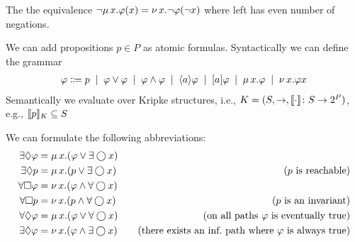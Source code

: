 \begin{remark}
 The the equivalence $\neg \mu\, x. \varphi(x) = \nu\, x . \neg \varphi (\neg x)$ where left has even number of negations.
\end{remark}



\begin{definition}
We can add propositions $p\in P$ as atomic formulas. Syntactically we can define the grammar
 \begin{align*}
        \varphi \Coloneqq p \; \mid \; \varphi \lor \varphi\; \mid \;  \varphi \land \varphi \; \mid \;  \langle a \rangle\varphi  \; \mid \; [ a ]\varphi  \; \mid \;  \mu\, x. \varphi \; \mid \; \nu\, x. \varphi x
\end{align*}
    Semantically we evaluate over Kripke structures, i.e., $K=(S, \to, \llbracket \cdot \rrbracket\colon S\to 2^P)$, e.g., $\llbracket p \rrbracket_K\subseteq S$
\end{definition}

\begin{remark}
    We can formulate the following abbreviations:
    \begin{align*}
        \exists \lozenge \varphi &= \mu\, x. (\varphi \lor \exists \bigcirc x) \\
        \exists \lozenge p &= \mu\, x. (p \lor \exists \bigcirc x) & \quad \text{($p$ is reachable)} \\
         \forall \square \varphi &= \nu\, x. (\varphi \land \forall \bigcirc x) \\
         \forall \square p &= \nu\, x. (p \land \forall \bigcirc x)  & \quad \text{($p$ is an invariant)}  \\
         \forall \lozenge \varphi &= \mu\, x. (\varphi \lor \forall \bigcirc x) & \quad \text{(on all paths $\varphi$ is eventually true)} \\
          \exists \lozenge \varphi &= \nu\, x. (\varphi \land \exists \bigcirc x) & \quad \text{(there exists an inf.\ path where $\varphi$ is always true)} 
    \end{align*}
\end{remark}



